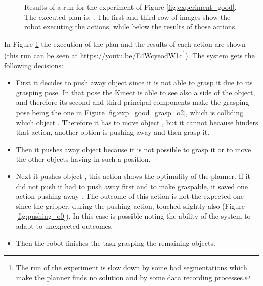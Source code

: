 \begin{figure}
\caption{Results of a run for the experiment of Figure \ref{fig:experiment_good}. The executed plan is:  
. The first and third row of images show the robot executing the actions, while below the results of those actions.}\label{fig:execution_experiment}
\end{figure}

In Figure \ref{fig:execution_experiment} the execution of the plan and the results of each action are shown (this run can be seen at \href{https://youtu.be/E4WcyeodW1c}{\url{https://youtu.be/E4WcyeodW1c}}\footnote{The run of the experiment is slow down by some bad segmentations which make the planner finds no solution and by some data recording processes.}). 
The system gets the following decisions:
\begin{itemize}
	\item First it decides to push away object  since it is not able to grasp it due to its grasping pose. In that pose the Kinect is able to see also a side of the object, and therefore its second and third principal components make the grasping pose being the one in Figure \ref{fig:exp_good_grasp_o2}, which is colliding which object . Therefore it has to move object , but it cannot because  hinders that action, another option is pushing away  and then grasp it.
	\item Then it pushes away object  because it is not possible to grasp it or to move the other objects having  in such a position.
	\item Next it pushes object , this action shows the optimality of the planner. If it did not push  it had to push away first  and  to make  graspable, it saved one action pushing away . The outcome of this action is not the expected one since the gripper, during the pushing action, touched slightly also  (Figure \ref{fig:pushing_o0}). In this case is possible noting the ability of the system to adapt to unexpected outcomes. 
	\item Then the robot finishes the task grasping the remaining objects.
\end{itemize}
 

